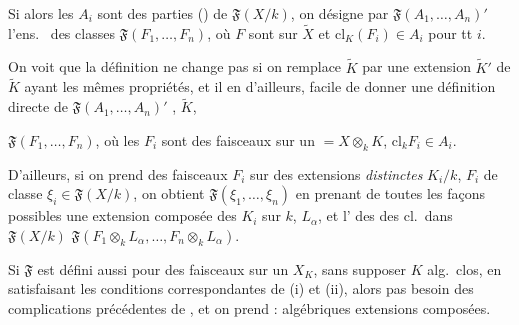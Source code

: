 \documentclass[11pt,a4paper]{article}
\begin{document}
 Si alors les $A_i$ sont des parties
() de $\mathfrak{F}(X/k)$, on désigne par
$\mathfrak{F}(A_1, \ldots, A_n)'$ l'ens.\  des classes 
$\mathfrak{F}(F_1, \ldots, F_n)$, où $F$ sont  sur
$\widetilde{X}$ et $\mathrm{cl}_K(F_i) \in A_i$ pour tt $i$.
\marginal{\ill{} \ill{} \ill{} \ill{}}

On voit \struck{\ill{}}  que la définition ne change pas si
on remplace $\widetilde{K}$ par une \ill{} extension $\widetilde{K}'$ de
$\widetilde{K}$ ayant les mêmes propriétés, et il en \ill{} d'ailleurs,
facile de donner une définition directe de $\mathfrak{F}(A_1, \ldots,
A_n)'$ \ill{},  $\widetilde{K}$, \ill{} \ill{} \ill{}
\ill{}

$\mathfrak{F}(F_1, \ldots, F_n)$, où les $F_i$ sont des faisceaux
 sur un \ill{} $= X \otimes_k K$, 
$\mathrm{cl}_k F_i \in A_i$.

D'ailleurs, si on prend \struck{\ill{}} des faisceaux  $F_i$
sur des extensions \emph{distinctes} $K_i/k$, $F_i$ de classe
$\xi_i \in \mathfrak{F}(X/k)$, on obtient $\mathfrak{F}(\xi_1, \ldots,
\xi_n)$ en prenant de toutes les façons possibles une extension composée
des $K_i$ sur $k$, \ill{} \ill{} \ill{}  $L_\alpha$,
et l'\ill{} \ill{} \ill{} des \ill{} des cl.\ dans $\mathfrak{F}(X/k)$
\add{\ill{} \ill{}}  $\mathfrak{F}(F_1 \otimes_k L_\alpha, \ldots, F_n
\otimes_k L_\alpha)$.

Si $\mathfrak{F}$ est défini aussi pour des faisceaux sur un $X_K$, sans
supposer $K$ alg.\ clos, en satisfaisant les conditions correspondantes
de (i) et (ii), alors \ill{} \ill{} pas besoin des complications
précédentes de \struck{\ill{} \ill{}} ,
et on prend : \ill{}  algébriques \ill{}
extensions composées.

\end{document}
